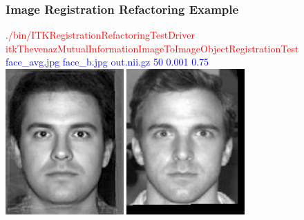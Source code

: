 \begin{frame}
\frametitle{Image Registration Refactoring Example}
\textcolor{red}{./bin/ITKRegistrationRefactoringTestDriver itkThevenazMutualInformationImageToImageObjectRegistrationTest }\\
\textcolor{blue}{face\_avg.jpg face\_b.jpg out.nii.gz  50 0.001 0.75 }\\
\includegraphics[height=2.2in]{../Art/face_avg.jpg}
\includegraphics[height=2.2in]{../Art/face_b_to_face_avg_aff.jpg}
\end{frame}
